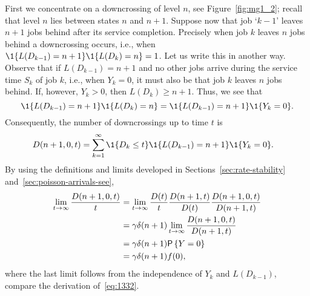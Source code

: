 First we concentrate on a downcrossing of level $n$, see
Figure~\ref{fig:mg1_2}; recall that level $n$ lies between states $n$
and $n+1$.  Suppose now that job `$k-1$' leaves $n+1$ jobs behind
after its service completion. Precisely when job $k$ leaves $n$ jobs
behind a downcrossing occurs, i.e., when
$\1{L(D_{k-1}) = n+1}\1{L(D_k)=n} = 1$. Let us write this in another
way. Observe that if $L(D_{k-1})=n+1$ and no other jobs arrive during
the service time $S_k$ of job $k$, i.e., when $Y_k=0$, it must also be
that job $k$ leaves $n$ jobs behind. If, however, $Y_k>0$, then
$L(D_k)\geq n+1$.  Thus, we see that
\begin{equation*}
  \1{L(D_{k-1}) = n+1}\1{L(D_k)=n} =  \1{L(D_{k-1}) = n+1}\1{Y_k=0}.
\end{equation*}
Consequently, the number of downcrossings up to time $t$ is
\begin{equation*}
  \begin{split}
  D(n+1, 0, t) 
&= \sum_{k=1}^\infty \1{D_{k}\leq t}\1{L(D_{k-1})=n+1}\1{Y_k=0}.
  \end{split}
\end{equation*}
By using the definitions and limits developed in
Sections~\ref{sec:rate-stability} and~\ref{sec:poisson-arrivals-see},
\begin{equation*}
  \begin{split}
  \lim_{t\to\infty} \frac{  D(n+1, 0, t)}t 
&=   \lim_{t\to\infty}  \frac{D(t)}t \frac{D(n+1, t)}{D(t)}\frac{ D(n+1, 0, t)}{D(n+1,t)} \\
&=   \gamma \delta(n+1) \lim_{t\to\infty} \frac{ D(n+1, 0, t)}{D(n+1,t)} \\
&=   \gamma \delta(n+1) \P{Y=0}\\
& = \gamma \delta(n+1) f(0),
  \end{split}
\end{equation*}
where the last limit follows from the independence of $Y_k$ and
$L(D_{k-1})$, compare the derivation of~\eqref{eq:1332}.

